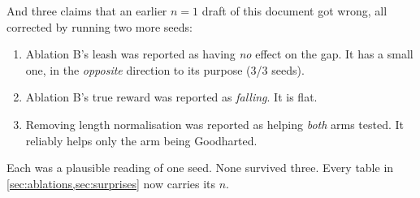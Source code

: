 \documentclass[11pt,letterpaper]{article}
\theoremstyle{definition}
\begin{document}
And three claims that an earlier $n=1$ draft of this document got wrong, all corrected by running two
more seeds:

\begin{enumerate}
  \item Ablation B's leash was reported as having \emph{no} effect on the gap. It has a small one, in
        the \emph{opposite} direction to its purpose (3/3 seeds).
  \item Ablation B's true reward was reported as \emph{falling}. It is flat.
  \item Removing length normalisation was reported as helping \emph{both} arms tested. It reliably
        helps only the arm being Goodharted.
\end{enumerate}

Each was a plausible reading of one seed. None survived three. Every table in
\cref{sec:ablations,sec:surprises} now carries its $n$.
\end{document}
